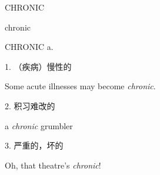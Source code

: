 \begin{flashcard}{
CHRONIC

chronic
}
\begin{center}
CHRONIC a. 
\end{center}
1. （疾病）慢性的

Some acute illnesses may become \textit{chronic}.

2. 积习难改的

a \textit{chronic} grumbler

3. 严重的，坏的

Oh, that theatre's \textit{chronic}!

\end{flashcard}
